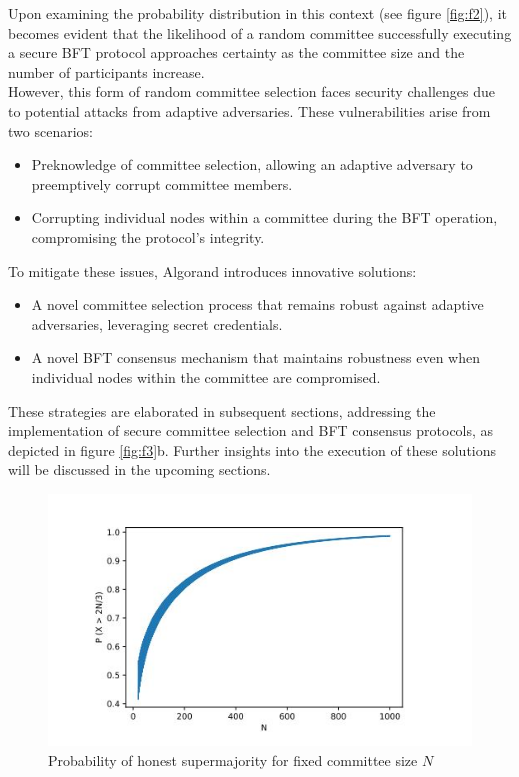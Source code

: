 \documentclass{report}
\begin{document}
Upon examining the probability distribution in this context (see figure \ref{fig:f2}), it becomes evident that the likelihood of a random committee successfully executing a secure BFT protocol approaches certainty as the committee size and the number of participants increase.\\
However, this form of random committee selection faces security challenges due to potential attacks from adaptive adversaries. These vulnerabilities arise from two scenarios: 
\begin{itemize}
	\item Preknowledge of committee selection, allowing an adaptive adversary to preemptively corrupt committee members.
	\item Corrupting individual nodes within a committee during the BFT operation, compromising the protocol's integrity.
\end{itemize}
To mitigate these issues, Algorand introduces innovative solutions: 
\begin{itemize}
	\item A novel committee selection process that remains robust against adaptive adversaries, leveraging secret credentials.
	\item A novel BFT consensus mechanism that maintains robustness even when individual nodes within the committee are compromised.
\end{itemize}
These strategies are elaborated in subsequent sections, addressing the implementation of secure committee selection and BFT consensus protocols, as depicted in figure \ref{fig:f3}b. Further insights into the execution of these solutions will be discussed in the upcoming sections.
\begin{center}
	\begin{figure}
		\centering
		\includegraphics[width=0.8\linewidth]{Fig/F1}
		\caption{Probability of honest supermajority for fixed committee size $N$}
		\label{fig:f1}
	\end{figure}
\end{center}
\end{document}

